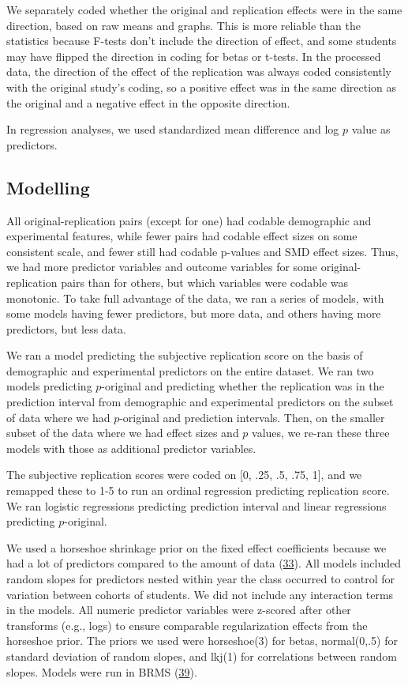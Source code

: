 \documentclass[
  english,
  a4paper,
]{article}
\begin{document}
We separately coded whether the original and replication effects were in the same direction, based on raw means and graphs. This is more reliable than the statistics because F-tests don't include the direction of effect, and some students may have flipped the direction in coding for betas or t-tests. In the processed data, the direction of the effect of the replication was always coded consistently with the original study's coding, so a positive effect was in the same direction as the original and a negative effect in the opposite direction.

In regression analyses, we used standardized mean difference and log \(p\) value as predictors.

\hypertarget{modelling}{%
\subsection{Modelling}\label{modelling}}

All original-replication pairs (except for one) had codable demographic and experimental features, while fewer pairs had codable effect sizes on some consistent scale, and fewer still had codable p-values and SMD effect sizes. Thus, we had more predictor variables and outcome variables for some original-replication pairs than for others, but which variables were codable was monotonic. To take full advantage of the data, we ran a series of models, with some models having fewer predictors, but more data, and others having more predictors, but less data.

We ran a model predicting the subjective replication score on the basis of demographic and experimental predictors on the entire dataset. We ran two models predicting \(p\)-original and predicting whether the replication was in the prediction interval from demographic and experimental predictors on the subset of data where we had \(p\)-original and prediction intervals. Then, on the smaller subset of the data where we had effect sizes and \(p\) values, we re-ran these three models with those as additional predictor variables.

The subjective replication scores were coded on {[}0, .25, .5, .75, 1{]}, and we remapped these to 1-5 to run an ordinal regression predicting replication score. We ran logistic regressions predicting prediction interval and linear regressions predicting \(p\)-original.

We used a horseshoe shrinkage prior on the fixed effect coefficients because we had a lot of predictors compared to the amount of data (\protect\hyperlink{ref-carvalho09}{33}). All models included random slopes for predictors nested within year the class occurred to control for variation between cohorts of students. We did not include any interaction terms in the models. All numeric predictor variables were z-scored after other transforms (e.g., logs) to ensure comparable regularization effects from the horseshoe prior. The priors we used were horseshoe(3) for betas, normal(0,.5) for standard deviation of random slopes, and lkj(1) for correlations between random slopes. Models were run in BRMS (\protect\hyperlink{ref-brms}{39}).
\end{document}
